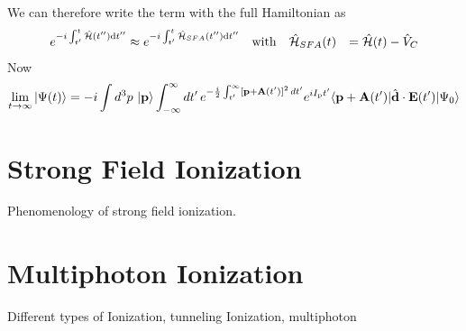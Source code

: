 We can therefore write the term with the full Hamiltonian as
\begin{equation*}
    \begin{aligned}
        e^{-i \int_{t'}^{t} \hat{\mathcal{H}}(t'') \mathrm{d} t''} &\approx e^{-i \int_{t'}^{t} \hat{\mathcal{H}}_{SFA}(t'') \mathrm{d} t''} \quad \text{with} \quad \hat{\mathcal{H}}_{SFA}(t) &= \hat{\mathcal{H}}(t) - \hat{V}_C
    \end{aligned}
\end{equation*}
Now
\begin{equation}
    \lim_{t \to \infty} \ket{\Psi(t)}  = -i \int d^3 p\, \ket{\mathbf{p}} \int_{-\infty}^{\infty} dt'\, e^{-\frac{i}{2}\int_{t'}^{\infty} [\mathbf{p}+\mathbf{A}(t')]^2 \, dt'} e^{i I_\mathrm{p} t'} \langle \mathbf{p} + \mathbf{A}(t') | \hat{\mathbf{d}} \cdot \mathbf{E}(t') | \Psi_0 \rangle
\end{equation}











\newpage
\section{Strong Field Ionization}

Phenomenology of strong field ionization.










\newpage
\section{Multiphoton Ionization}

Different types of Ionization, tunneling Ionization, multiphoton